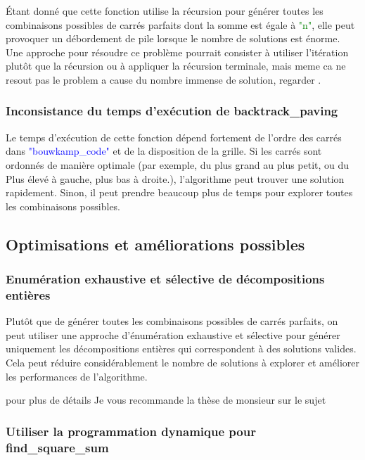 \documentclass{article}
\begin{document}
Étant donné que cette fonction utilise la récursion pour générer toutes les combinaisons possibles de carrés parfaits dont la somme est égale à \textcolor{green}{"n"}, elle peut provoquer un débordement de pile lorsque le nombre de solutions est énorme. Une approche pour résoudre ce problème pourrait consister à utiliser l'itération plutôt que la récursion ou à appliquer la récursion terminale, mais meme ca ne resout pas le problem a cause du nombre immense de solution, regarder .\newline

\subsubsection{Inconsistance du temps d'exécution de backtrack\_paving}
Le temps d'exécution de cette fonction dépend fortement de l'ordre des carrés dans \textcolor{blue}{"bouwkamp\_code"} et de la disposition de la grille. Si les carrés sont ordonnés de manière optimale (par exemple, du plus grand au plus petit, ou du Plus élevé à gauche, plus bas à droite.), l'algorithme peut trouver une solution rapidement. Sinon, il peut prendre beaucoup plus de temps pour explorer toutes les combinaisons possibles.\newline

\subsection{Optimisations et améliorations possibles }

\subsubsection{Enumération exhaustive et sélective de décompositions entières}
Plutôt que de générer toutes les combinaisons possibles de carrés parfaits, on peut utiliser une approche d'énumération exhaustive et sélective pour générer uniquement les décompositions entières qui correspondent à des solutions valides. Cela peut réduire considérablement le nombre de solutions à explorer et améliorer les performances de l'algorithme.\newline

pour plus de détails Je vous recommande la thèse de monsieur \citet{Gambini1999} sur le sujet\newline

\subsubsection{Utiliser la programmation dynamique pour find\_square\_sum}
\end{document}
